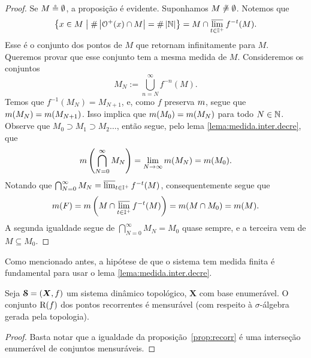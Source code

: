 \begin{proof}
Se $M \circeq \emptyset$, a proposição é evidente. Suponhamos $M \not\circeq \emptyset$.
Notemos que
	\begin{equation*}
	\left\{{x \in M}\;\middle\vert\;{\#\left\lvert{\mathcal{O}^+(x) \cap M}\right\rvert = \#\left\lvert{\mathbb{N}}\right\rvert}\right\} = M \cap \varlimsup_{t \in \mathbb{I}^+} f^{-t}(M).
	\end{equation*}
Esse é o conjunto dos pontos de $M$ que retornam infinitamente para $M$. Queremos provar que esse conjunto tem a mesma medida de $M$. Consideremos os conjuntos
	\begin{equation*}
	M_N := \bigcup_{n=N}^\infty f^{-n}(M).
	\end{equation*}
Temos que $f^{-1}(M_N)=M_{N+1}$, e, como $f$ preserva $m$, segue que $m(M_N)=m(M_{N+1})$. Isso implica que $m(M_0)=m(M_N)$ para todo $N \in \mathbb{N}$. Observe que $M_0 \supset M_1 \supset M_2 \ldots$, então segue, pelo lema \ref{lema:medida.inter.decre}, que
	\begin{equation*}
	m\left( \bigcap_{N=0}^\infty M_N \right) = \lim_{N \to \infty} m(M_N) = m(M_0).
	\end{equation*}
Notando que $\bigcap_{N=0}^\infty M_N = \varlimsup_{t \in \mathbb{I}^+} f^{-t}(M)$, consequentemente segue que
	\begin{equation*}
	m(F)= m\left(M \cap \varlimsup_{t \in \mathbb{I}^+} f^{-t}(M) \right) =m(M\cap M_0)=m(M).
	\end{equation*}
A segunda igualdade segue de $\bigcap_{N=0}^\infty M_N = M_0$ quase sempre, e a terceira vem de $M \subseteq M_0$.
\end{proof}

Como mencionado antes, a hipótese de que o sistema tem medida finita é fundamental para usar o lema \ref{lema:medida.inter.decre}.

\begin{proposition}
Seja $\bm{\mathcal{S}}=(\bm X,f)$ um sistema dinâmico topológico, $\bm X$ com base enumerável. O conjunto $\mathrm{R}(f)$ dos pontos recorrentes é mensurável (com respeito à $\sigma$-álgebra gerada pela topologia).
\end{proposition}
\begin{proof}
Basta notar que a igualdade da proposição~\ref{prop:recorr} é uma interseção enumerável de conjuntos mensuráveis.
\end{proof}


